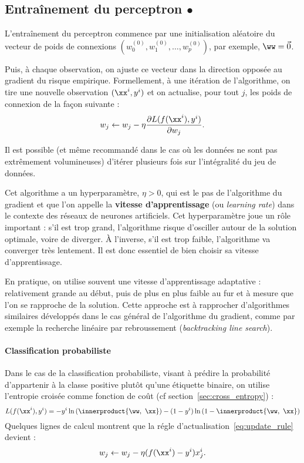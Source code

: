 \subsection{Entraînement du perceptron $\bullet$}
\label{sec:train_perceptron}

L'entraînement du perceptron commence par
une initialisation aléatoire du vecteur de poids de connexions
$\left( w_0^{(0)}, w_1^{(0)}, \dots, w_p^{(0)} \right)$, par exemple, $\ww = \vec{0}$.

Puis, à chaque observation, on ajuste ce vecteur dans la direction opposée au
gradient du risque empirique. Formellement, à une itération de l'algorithme,
on tire une nouvelle observation $(\xx^i, y^i)$ et on actualise, pour tout $j$,
les poids de connexion de la façon suivante :
\begin{equation}
  \label{eq:update_rule}
  w_j \leftarrow w_j - \eta \frac{\partial L(f(\xx^i), y^i)}{\partial w_j}.
\end{equation}

Il est possible (et même recommandé dans le cas où les données ne sont pas
extrêmement volumineuses) d'itérer plusieurs fois sur l'intégralité du jeu
de données. %

Cet algorithme a un hyperparamètre, $\eta > 0$, qui est le pas de l'algorithme
du gradient et que l'on appelle la \textbf{vitesse d'apprentissage} (ou {\it
  learning rate}) dans le contexte des réseaux de neurones artificiels. Cet
hyperparamètre joue un rôle important : s'il est trop grand, l'algorithme
risque d'osciller autour de la solution optimale, voire de diverger. À
l'inverse, s'il est trop faible, l'algorithme va converger très lentement. Il
est donc essentiel de bien choisir sa vitesse d'apprentissage.

En pratique, on utilise souvent une vitesse d'apprentissage adaptative :
relativement grande au début, puis de plus en plus faible au fur et à mesure
que l'on se rapproche de la solution. Cette approche est à rapprocher
d'algorithmes similaires développés dans le cas général de l'algorithme du
gradient, comme par exemple la recherche linéaire par rebroussement
(\textit{backtracking line search}).

\paragraph{Classification probabiliste}
Dans le cas de la classification probabiliste, visant à prédire la probabilité
d'appartenir à la classe positive plutôt qu'une étiquette binaire, on utilise
l'entropie croisée comme fonction de coût (cf section~\ref{sec:cross_entropy}) :
\begin{equation*}
  L(f(\xx^i), y^i) = 
- y^i \ln \left( \innerproduct{\ww,~\xx} \right) - (1-y^i) \ln \left( 1 - \innerproduct{\ww,~\xx}\right) 
\end{equation*}
Quelques lignes de calcul montrent que la régle d'actualisation~\eqref{eq:update_rule} devient :
\begin{equation}
  \label{eq:update_rule_class_prob}
  w_j \leftarrow w_j - \eta (f(\xx^i) - y^i) x_j^i.
\end{equation}

